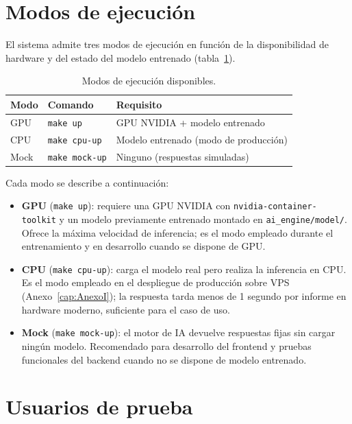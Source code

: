 \section{Modos de ejecución}

El sistema admite tres modos de ejecución en función de la disponibilidad de hardware y del estado del modelo entrenado (tabla~\ref{tab:modos}).

\begin{table}[h]
\centering
\caption{Modos de ejecución disponibles.}
\label{tab:modos}
\begin{tabular}{lll}
\hline
\textbf{Modo} & \textbf{Comando} & \textbf{Requisito} \\
\hline
GPU & \texttt{make up} & GPU NVIDIA + modelo entrenado \\
CPU & \texttt{make cpu-up} & Modelo entrenado (modo de producción) \\
Mock & \texttt{make mock-up} & Ninguno (respuestas simuladas) \\
\hline
\end{tabular}
\end{table}

Cada modo se describe a continuación:

\begin{sloppypar}
\begin{itemize}
 \item \textbf{GPU} (\texttt{make up}): requiere una GPU NVIDIA con \texttt{nvidia-container-toolkit} y un modelo previamente entrenado montado en \texttt{ai\_engine/model/}. Ofrece la máxima velocidad de inferencia; es el modo empleado durante el entrenamiento y en desarrollo cuando se dispone de GPU.
 \item \textbf{CPU} (\texttt{make cpu-up}): carga el modelo real pero realiza la inferencia en CPU. Es el modo empleado en el despliegue de producción sobre VPS (Anexo~\ref{cap:AnexoI}); la respuesta tarda menos de 1 segundo por informe en hardware moderno, suficiente para el caso de uso.
 \item \textbf{Mock} (\texttt{make mock-up}): el motor de IA devuelve respuestas fijas sin cargar ningún modelo. Recomendado para desarrollo del frontend y pruebas funcionales del backend cuando no se dispone de modelo entrenado.
\end{itemize}
\end{sloppypar}

\section{Usuarios de prueba}

